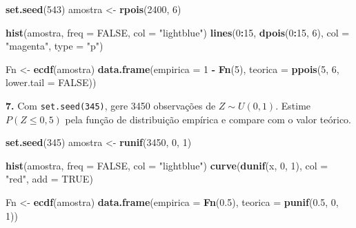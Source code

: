 \documentclass[
  portuguese,
  11pt,
  openany]{book}
\newenvironment{Shaded}{\begin{snugshade}}{\end{snugshade}}
\newcommand{\AttributeTok}[1]{\textcolor[rgb]{0.13,0.29,0.53}{#1}}
\newcommand{\ConstantTok}[1]{\textcolor[rgb]{0.56,0.35,0.01}{#1}}
\newcommand{\DecValTok}[1]{\textcolor[rgb]{0.00,0.00,0.81}{#1}}
\newcommand{\FloatTok}[1]{\textcolor[rgb]{0.00,0.00,0.81}{#1}}
\newcommand{\FunctionTok}[1]{\textcolor[rgb]{0.13,0.29,0.53}{\textbf{#1}}}
\newcommand{\NormalTok}[1]{#1}
\newcommand{\OtherTok}[1]{\textcolor[rgb]{0.56,0.35,0.01}{#1}}
\newcommand{\SpecialCharTok}[1]{\textcolor[rgb]{0.81,0.36,0.00}{\textbf{#1}}}
\newcommand{\StringTok}[1]{\textcolor[rgb]{0.31,0.60,0.02}{#1}}
\begin{document}
\begin{Shaded}
\begin{Highlighting}[]
\FunctionTok{set.seed}\NormalTok{(}\DecValTok{543}\NormalTok{)}
\NormalTok{amostra }\OtherTok{\textless{}{-}} \FunctionTok{rpois}\NormalTok{(}\DecValTok{2400}\NormalTok{, }\DecValTok{6}\NormalTok{)}

\FunctionTok{hist}\NormalTok{(amostra, }\AttributeTok{freq =} \ConstantTok{FALSE}\NormalTok{, }\AttributeTok{col =} \StringTok{"lightblue"}\NormalTok{)}
\FunctionTok{lines}\NormalTok{(}\DecValTok{0}\SpecialCharTok{:}\DecValTok{15}\NormalTok{, }\FunctionTok{dpois}\NormalTok{(}\DecValTok{0}\SpecialCharTok{:}\DecValTok{15}\NormalTok{, }\DecValTok{6}\NormalTok{), }\AttributeTok{col =} \StringTok{"magenta"}\NormalTok{, }\AttributeTok{type =} \StringTok{"p"}\NormalTok{)}

\NormalTok{Fn }\OtherTok{\textless{}{-}} \FunctionTok{ecdf}\NormalTok{(amostra)}
\FunctionTok{data.frame}\NormalTok{(}\AttributeTok{empirica =} \DecValTok{1} \SpecialCharTok{{-}} \FunctionTok{Fn}\NormalTok{(}\DecValTok{5}\NormalTok{), }\AttributeTok{teorica =} \FunctionTok{ppois}\NormalTok{(}\DecValTok{5}\NormalTok{, }\DecValTok{6}\NormalTok{, }\AttributeTok{lower.tail =} \ConstantTok{FALSE}\NormalTok{))}
\end{Highlighting}
\end{Shaded}

\textbf{7.} Com \texttt{set.seed(345)}, gere 3450 observações de \(Z \sim U(0, 1)\). Estime
\(P(Z \leq 0{,}5)\) pela função de distribuição empírica e compare com o valor teórico.

\begin{Shaded}
\begin{Highlighting}[]
\FunctionTok{set.seed}\NormalTok{(}\DecValTok{345}\NormalTok{)}
\NormalTok{amostra }\OtherTok{\textless{}{-}} \FunctionTok{runif}\NormalTok{(}\DecValTok{3450}\NormalTok{, }\DecValTok{0}\NormalTok{, }\DecValTok{1}\NormalTok{)}

\FunctionTok{hist}\NormalTok{(amostra, }\AttributeTok{freq =} \ConstantTok{FALSE}\NormalTok{, }\AttributeTok{col =} \StringTok{"lightblue"}\NormalTok{)}
\FunctionTok{curve}\NormalTok{(}\FunctionTok{dunif}\NormalTok{(x, }\DecValTok{0}\NormalTok{, }\DecValTok{1}\NormalTok{), }\AttributeTok{col =} \StringTok{"red"}\NormalTok{, }\AttributeTok{add =} \ConstantTok{TRUE}\NormalTok{)}

\NormalTok{Fn }\OtherTok{\textless{}{-}} \FunctionTok{ecdf}\NormalTok{(amostra)}
\FunctionTok{data.frame}\NormalTok{(}\AttributeTok{empirica =} \FunctionTok{Fn}\NormalTok{(}\FloatTok{0.5}\NormalTok{), }\AttributeTok{teorica =} \FunctionTok{punif}\NormalTok{(}\FloatTok{0.5}\NormalTok{, }\DecValTok{0}\NormalTok{, }\DecValTok{1}\NormalTok{))}
\end{Highlighting}
\end{Shaded}
\end{document}
